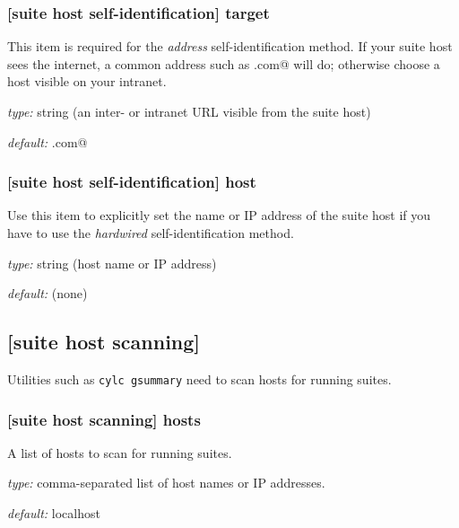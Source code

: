 \subsubsection[target]{[suite host self-identification] \textrightarrow target }

This item is required for the {\em address} self-identification method.
If your suite host sees the internet, a common address such as
\lstinline@google.com@ will do; otherwise choose a host visible on your
intranet.
\begin{myitemize}
\item {\em type:} string (an inter- or intranet URL visible from the suite host)
\item {\em default:} \lstinline@google.com@
\end{myitemize}


\subsubsection[host]{[suite host self-identification] \textrightarrow host }

Use this item to explicitly set the name or IP address of the suite host
if you have to use the {\em hardwired} self-identification method.
\begin{myitemize}
\item {\em type:} string (host name or IP address)
\item {\em default:} (none)
\end{myitemize}

\subsection{[suite host scanning]}

Utilities such as \lstinline=cylc gsummary= need to scan hosts for
running suites.

\subsubsection[hosts]{[suite host scanning] \textrightarrow hosts }

A list of hosts to scan for running suites.
\begin{myitemize}
\item {\em type:} comma-separated list of host names or IP addresses.
\item {\em default:} localhost
\end{myitemize}

